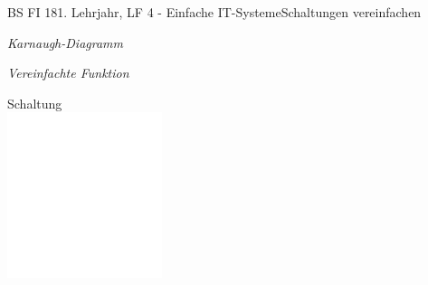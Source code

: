 \documentclass[oneside,openany,headings=optiontotoc,11pt,numbers=noenddot]{scrreprt}
\begin{document}
\begin{worksheet}{BS FI 18}{1. Lehrjahr, LF 4 - Einfache IT-Systeme}{Schaltungen vereinfachen}
		\begin{framed}
			\noindent
			\begin{minipage}{0.48\textwidth}
				\tiny{\textit{\color{codegray}Karnaugh-Diagramm}}\\
				\normalsize
			\end{minipage}
			\hfill
			\begin{minipage}{0.48\textwidth}
					\begin{minipage}{0.48\textwidth}
					\tiny{\textit{\color{codegray}Vereinfachte Funktion}}\\
					\normalsize
				\end{minipage}
			\end{minipage}
			\begin{minipage}{0.48\textwidth}
				
				\begin{karnaugh-map}[4][2][1][$x_2x_3$][$x_1$]
					
				\end{karnaugh-map}
			\end{minipage}
			\hfill
		\end{framed}
		\begin{framed}
			\noindent
			\tiny{\color{codegray}Schaltung}\\
			\normalsize
			\includegraphics[width=0.34\textwidth]{../../empty.jpg}
		\end{framed}
	\end{worksheet}
\end{document}
